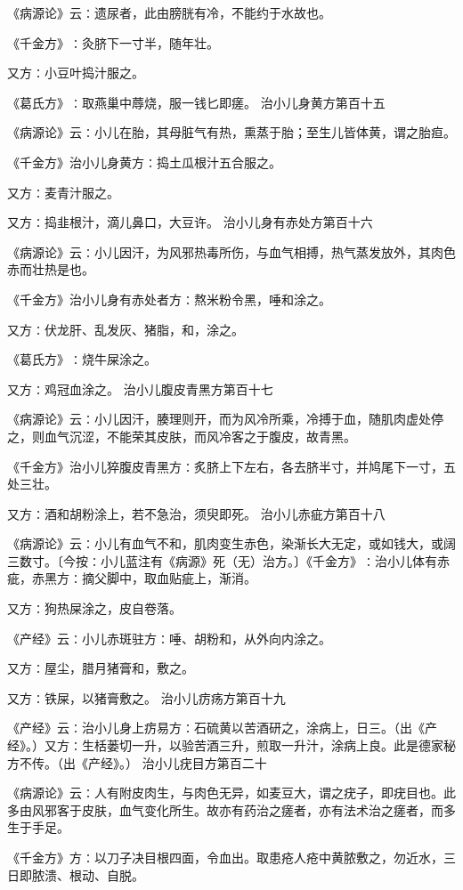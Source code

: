 \documentclass[a4paper,12pt,UTF8,twoside]{ctexbook}
\begin{document}
《病源论》云∶遗尿者，此由膀胱有冷，不能约于水故也。

《千金方》∶灸脐下一寸半，随年壮。

又方∶小豆叶捣汁服之。

《葛氏方》∶取燕巢中蓐烧，服一钱匕即瘥。
治小儿身黄方第百十五

《病源论》云∶小儿在胎，其母脏气有热，熏蒸于胎；至生儿皆体黄，谓之胎疸。

《千金方》治小儿身黄方∶捣土瓜根汁五合服之。

又方∶麦青汁服之。

又方∶捣韭根汁，滴儿鼻口，大豆许。
治小儿身有赤处方第百十六

《病源论》云∶小儿因汗，为风邪热毒所伤，与血气相搏，热气蒸发放外，其肉色赤而壮热是也。

《千金方》治小儿身有赤处者方∶熬米粉令黑，唾和涂之。

又方∶伏龙肝、乱发灰、猪脂，和，涂之。

《葛氏方》∶烧牛屎涂之。

又方∶鸡冠血涂之。
治小儿腹皮青黑方第百十七

《病源论》云∶小儿因汗，腠理则开，而为风冷所乘，冷搏于血，随肌肉虚处停之，则血气沉涩，不能荣其皮肤，而风冷客之于腹皮，故青黑。

《千金方》治小儿猝腹皮青黑方∶炙脐上下左右，各去脐半寸，并鸠尾下一寸，五处三壮。

又方∶酒和胡粉涂上，若不急治，须臾即死。
治小儿赤疵方第百十八

《病源论》云∶小儿有血气不和，肌肉变生赤色，染渐长大无定，或如钱大，或阔三数寸。〔今按∶小儿蓝注有《病源》死（无）治方。〕《千金方》∶治小儿体有赤疵，赤黑方∶摘父脚中，取血贴疵上，渐消。

又方∶狗热屎涂之，皮自卷落。

《产经》云∶小儿赤斑驻方∶唾、胡粉和，从外向内涂之。

又方∶屋尘，腊月猪膏和，敷之。

又方∶铁屎，以猪膏敷之。
治小儿疠疡方第百十九

《产经》云∶治小儿身上疠易方∶石硫黄以苦酒研之，涂病上，日三。（出《产经》。）又方∶生栝蒌切一升，以验苦酒三升，煎取一升汁，涂病上良。此是德家秘方不传。（出《产经》。）
治小儿疣目方第百二十

《病源论》云∶人有附皮肉生，与肉色无异，如麦豆大，谓之疣子，即疣目也。此多由风邪客于皮肤，血气变化所生。故亦有药治之瘥者，亦有法术治之瘥者，而多生于手足。

《千金方》方∶以刀子决目根四面，令血出。取患疮人疮中黄脓敷之，勿近水，三日即脓溃、根动、自脱。
\end{document}
